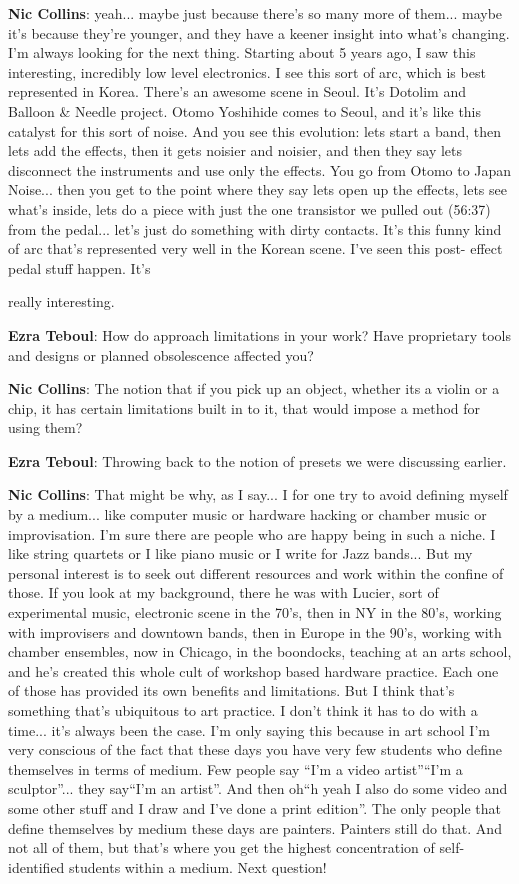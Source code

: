 \textbf{Nic Collins}: yeah... maybe just because there’s so many more of them... maybe it’s because they’re younger, and they have a keener insight into what’s changing. I’m always looking for the next thing. Starting about 5 years ago, I saw this interesting, incredibly low level electronics. I see this sort of arc, which is best represented in Korea. There’s an awesome scene in Seoul. It’s Dotolim and Balloon & Needle project. Otomo Yoshihide comes to Seoul, and it’s like this catalyst for this sort of noise. And you see this evolution: lets start a band, then lets add the effects, then it gets noisier and noisier, and then they say lets disconnect the instruments and use only the effects. You go from Otomo to Japan Noise... then you get to the point where they say lets open up the effects, lets see what’s inside, lets do a piece with just the one transistor we pulled out (56:37) from the pedal... let’s just do something with dirty contacts. It’s this funny kind of arc that’s represented
very well in the Korean scene. I’ve seen this post- effect pedal stuff happen. It’s
					
really interesting.
					
\textbf{Ezra Teboul}: How do approach limitations in your work? Have proprietary tools and designs or planned obsolescence affected you?
					
\textbf{Nic Collins}: The notion that if you pick up an object, whether its a violin or a chip, it has certain limitations built in to it, that would impose a method for using them?
					
\textbf{Ezra Teboul}: Throwing back to the notion of presets we were discussing earlier.
					
\textbf{Nic Collins}: That might be why, as I say... I for one try to avoid defining myself by a medium... like computer music or hardware hacking or chamber music or improvisation. I’m sure there are people who are happy being in such a niche. I like string quartets or I like piano music or I write for Jazz bands... But my personal interest is to seek out different resources and work within the confine of those. If you look at my background, there he was with Lucier, sort of experimental music, electronic scene in the 70’s, then in NY in the 80’s, working with improvisers and downtown bands, then in Europe in the 90’s, working with chamber ensembles, now in Chicago, in the boondocks, teaching at an arts school, and he’s created this whole cult of workshop based hardware practice. Each one of those has provided its own benefits and limitations. But I think that’s something that’s ubiquitous to art practice. I don’t think it has to do with a time... it’s always been the case. I’m only saying this because in art school I’m very conscious of the fact that these days you have very few students who define themselves in terms of medium. Few people say ``I’m a video artist''``I’m a sculptor''... they say``I’m an artist''. And then oh``h yeah I also do some video and some other stuff and I draw and I’ve done a print edition''. The only people that define themselves by medium these days are painters. Painters still do that. And not all of them, but that’s where you get the
highest concentration of self-identified students within a medium. Next question!
					
